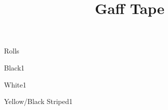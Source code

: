 \def\papersize{5}




\title{Gaff Tape}

\begin{checklist}{Rolls}
  \item{Black}{1}
  \item{White}{1}
  \item{Yellow/Black Striped}{1}
\end{checklist}


